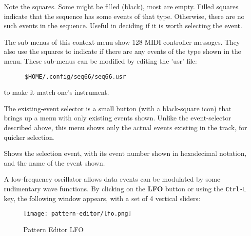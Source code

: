    Note the squares.  Some might be filled (black), most are empty.
   Filled squares indicate that the sequence has some events of that type.
   Otherwise, there are no such events in the sequence.
   Useful in deciding if it is worth selecting the event.

   The sub-menus of this context menu show 128 MIDI controller messages.
   They also use the squares to
   indicate if there are any events of the type shown in the menu.
   These sub-menus can be modified by editing the 'usr' file:
   
   \begin{verbatim}
      $HOME/.config/seq66/seq66.usr
   \end{verbatim}

   to make it match one's instrument.

   The existing-event selector is a small button (with a black-square icon)
   that brings up a menu with only existing events shown.
   Unlike the event-selector described above, this menu
   shows only the actual events existing in the track, for quicker selection.

   Shows the selection event, with its event number shown in hexadecimal
   notation, and the name of the event shown.

   A low-frequency oscillator allows data events
   can be modulated by some rudimentary wave functions.
   By clicking on the \textbf{LFO} button or using the \texttt{Ctrl-L} key,
   the following window appears, with a set of 4 vertical sliders:

\begin{figure}[H]
   \centering 
  \texttt{[image: pattern-editor/lfo.png]}
   \caption{Pattern Editor LFO}
   \label{fig:pattern_editor_bottom_lfo}
\end{figure}


